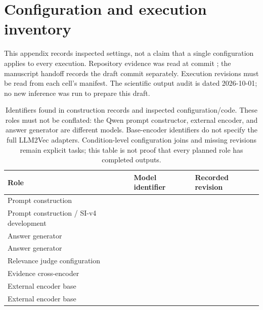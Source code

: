 \clearpage
\onecolumn
\nolinenumbers
\section{Configuration and execution inventory}
\label{app:config}
This appendix records inspected settings, not a claim that a single configuration applies to every execution. Repository evidence was read at commit ; the manuscript handoff records the draft commit separately. Execution revisions must be read from each cell's manifest. The scientific output audit is dated 2026-10-01; no new inference was run to prepare this draft.

\begin{table}[!htbp]
\small
\begin{tabularx}{\textwidth}{@{}p{}Yp{.34\textwidth}@{}}
\toprule
Role & Model identifier & Recorded revision\\
\midrule
Prompt construction &  & \\
Prompt construction / SI-v4 development &  & \\
Answer generator &  & \\
Answer generator &  & \\
Relevance judge configuration &  & \\
Evidence cross-encoder &  & \\
External encoder base &  & \\
External encoder base &  & \\
\bottomrule
\end{tabularx}
\caption{Identifiers found in construction records and inspected configuration/code. These roles must not be conflated: the Qwen prompt constructor, external encoder, and answer generator are different models. Base-encoder identifiers do not specify the full LLM2Vec adapters. Condition-level configuration joins and missing revisions remain explicit tasks; this table is not proof that every planned role has completed outputs.}
\label{tab:models}
\end{table}

